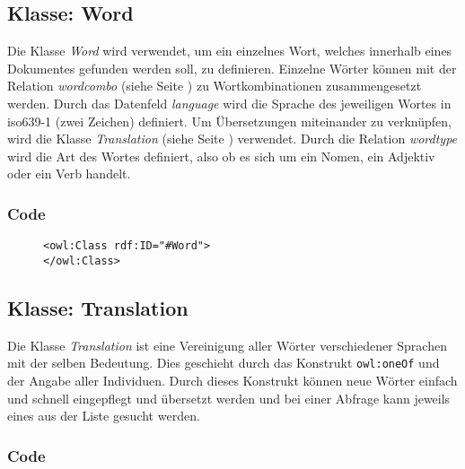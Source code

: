 \documentclass[
    11pt,
    latin1,
    a4paper,
    oneside
]{scrreprt}
\begin{document}
\subsection{Klasse: Word} \label{sec:class_word}

Die Klasse \emph{Word} wird verwendet, um ein einzelnes Wort, welches innerhalb eines Dokumentes gefunden werden soll, zu definieren. Einzelne W\"orter k\"onnen mit der Relation \emph{wordcombo} (siehe  Seite \pageref{sec:rel_wordcombo}) zu Wortkombinationen zusammengesetzt werden. Durch das Datenfeld \emph{language} wird die Sprache des jeweiligen Wortes in iso639-1 (zwei Zeichen) definiert. Um \"Ubersetzungen miteinander zu verkn\"upfen, wird die Klasse \emph{Translation} (siehe  Seite \pageref{sec:class_translation}) verwendet. Durch die Relation \emph{wordtype} wird die Art des Wortes definiert, also ob es sich um ein Nomen, ein Adjektiv oder ein Verb handelt.

\subsubsection{Code}  \label{sec:class_word_code}

\begin{figure}[h]
 \lstset{language=XML}
 \begin{lstlisting}[label=owl:word,caption={Die Klasse \emph{Word} beschreibt ein einzelnes Wort}]
<owl:Class rdf:ID="#Word">
</owl:Class>
 \end{lstlisting}
\end{figure}

\subsection{Klasse: Translation} \label{sec:class_translation}

Die Klasse \emph{Translation} ist eine Vereinigung aller W\"orter verschiedener Sprachen mit der selben Bedeutung. Dies geschieht durch das Konstrukt \texttt{owl:oneOf} und der Angabe aller Individuen. Durch dieses Konstrukt k\"onnen neue W\"orter einfach und schnell eingepflegt und \"ubersetzt werden und bei einer Abfrage kann jeweils eines aus der Liste gesucht werden.

\subsubsection{Code}  \label{sec:class_translation_code}
\end{document}
